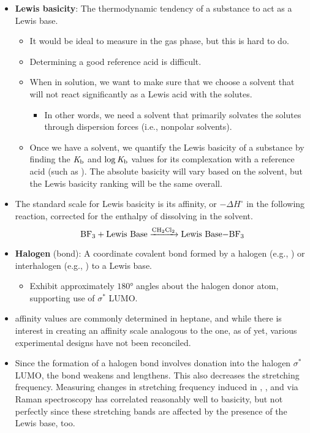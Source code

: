 \documentclass[../notes.tex]{subfiles}
\begin{document}
\begin{itemize}
\begin{itemize}
    \end{itemize}
    \item \textbf{Lewis basicity}: The thermodynamic tendency of a substance to act as a Lewis base.
    \begin{itemize}
        \item It would be ideal to measure in the gas phase, but this is hard to do.
        \item Determining a good reference acid is difficult.
        \item When in solution, we want to make sure that we choose a solvent that will not react significantly as a Lewis acid with the solutes.
        \begin{itemize}
            \item In other words, we need a solvent that primarily solvates the solutes through dispersion forces (i.e., nonpolar solvents).
        \end{itemize}
        \item Once we have a solvent, we quantify the Lewis basicity of a substance by finding the $\operatorname{\emph{K}_b}$ and $\log\operatorname{\emph{K}_b}$ values for its complexation with a reference acid (such as ). The absolute basicity will vary based on the solvent, but the Lewis basicity ranking will be the same overall.
    \end{itemize}
    \item The standard scale for Lewis basicity is its  affinity, or $-\Delta H^\circ$ in the following reaction, corrected for the enthalpy of  dissolving in the solvent.
    \begin{equation*}
        \ce{BF3 + \text{Lewis Base} ->[CH2Cl2] \text{Lewis Base}-BF3}
    \end{equation*}
    \item \textbf{Halogen} (bond): A coordinate covalent bond formed by a halogen  (e.g., ) or interhalogen  (e.g., ) to a Lewis base.
    \begin{itemize}
        \item Exhibit approximately $\ang{180}$ angles about the halogen donor atom, supporting use of $\sigma^*$ LUMO.
    \end{itemize}
    \item {} affinity values are commonly determined in heptane, and while there is interest in creating an  affinity scale analogous to the  one, as of yet, various experimental designs have not been reconciled.
    \item Since the formation of a halogen bond involves donation into the halogen $\sigma^*$ LUMO, the  bond weakens and lengthens. This also decreases the stretching frequency. Measuring changes in stretching frequency induced in , , and  via Raman spectroscopy has correlated reasonably well to basicity, but not perfectly since these stretching bands are affected by the presence of the Lewis base, too.

\end{itemize}
\end{document}
